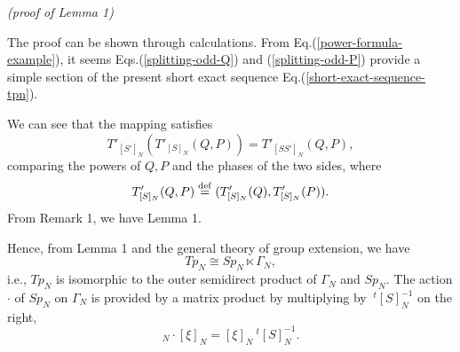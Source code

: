 \documentclass[12pt]{iopart}
\newcommand{\deq}{\stackrel{\rm{\tiny def}}{=}}
\begin{document}
\noindent
{\it (proof of Lemma 1)}

The proof can be shown through calculations.
From Eq.(\ref{power-formula-example}),
it seems
Eqs.(\ref{splitting-odd-Q}) and (\ref{splitting-odd-P})
provide a simple section of the present short exact sequence Eq.(\ref{short-exact-sequence-tpn}).

We can see that the mapping %
satisfies
\begin{equation}
T'_{[S']_N}(T'_{[S]_N}(Q,P))=T'_{[SS']_N}(Q,P),
\end{equation}
comparing the powers of \(Q,P\) and the phases of the two sides,
where
\begin{equation}
T'_{[S]_N}(Q,P)\deq(T'_{[S]_N}(Q),T'_{[S]_N}(P)).
\end{equation}
%
From Remark 1, we have Lemma 1.

Hence, from Lemma 1 and the general theory of group extension, we have
\begin{equation}
Tp_N\cong Sp_N\ltimes\Gamma_N,
\end{equation}
i.e., \(Tp_N\) is isomorphic to the outer semidirect product of \(\Gamma_N\) and \(Sp_N\).
The action \(\cdot\) of \(Sp_N\) on \(\Gamma_N\) is provided by a matrix product by multiplying by \(\ ^t[S]_N^{-1}\) on the right,
\begin{equation}
[S]_N\cdot[\xi]_N=
[\xi]_N\ ^t[S]_N^{-1}.
\end{equation}
\end{document}
